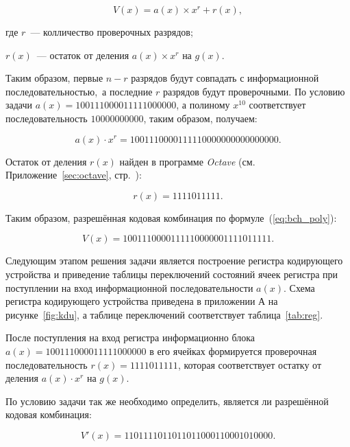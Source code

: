 \begin{equation}
  \label{eq:bch_poly}
  V(x) = a(x) \times x^r + r(x),
\end{equation}


\begin{ESKDexplanation}
\item[где ] $r$~--- колличество проверочных разрядов;
\item $r(x)$~--- остаток от деления $a(x) \times x^r$ на $g(x)$.
\end{ESKDexplanation}

Таким образом, первые $n-r$ разрядов будут совпадать с информационной
последовательностью,~а последние $r$ разрядов будут проверочными. По
условию задачи $a(x) = 100111000011111000000$, а полиному $x^{10}$
соответствует последовательность $10000000000$, таким образом,
получаем:

\begin{equation*}
  a(x) \cdot x^r = 1001110000111110000000000000000.
\end{equation*}

Остаток от деления $r(x)$ найден в программе
\textit{Octave} (см. Приложение~\ref{sec:octave},
стр.~\pageref{page2}):

\begin{equation*}
r(x) = 1111011111.
\end{equation*}


Таким образом, разрешённая кодовая комбинация по
формуле~(\ref{eq:bch_poly}):

\begin{equation*}
  V(x) = 1001110000111110000001111011111.
\end{equation*}

Следующим этапом решения задачи является построение регистра
кодирующего устройства и приведение таблицы переключений состояний
ячеек регистра при поступлении на вход информационной
последовательности $a(x)$. Схема регистра кодирующего устройства
приведена в приложении А на рисунке~\ref{fig:kdu}, а таблице
переключений соответствует таблица~\ref{tab:reg}.

После поступления на вход регистра информационно блока $a(x) =
100111000011111000000$ в его ячейках формируется проверочная
последовательность $r(x) = 1111011111$, которая соответствует остатку от
деления $a(x) \cdot x^r$ на $g(x)$.

По условию задачи так же необходимо определить, является ли разрешённой
кодовая комбинация:

\begin{equation*}
  V'(x) = 1101111011011011000110001010000.
\end{equation*}

